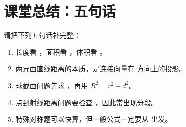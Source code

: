 \documentclass[11pt,a4paper]{ctexart}
\begin{document}


\section{课堂总结：五句话}

请把下列五句话补完整：

\begin{enumerate}[label=\arabic*. , leftmargin=2em, itemsep=1.2em]
  \item 长度看 \blank{3cm}，面积看 \blank{3cm}，体积看 \blank{3cm}。
  \item 两异面直线距离的本质，是连接向量在 \blank{4cm} 方向上的投影。
  \item 球截面问题先求 \blank{4cm}，再用 \(R^2=r^2+d^2\)。
  \item 点到射线距离问题要检查 \blank{5cm}，因此常出现分段。
  \item 特殊对称题可以快算，但一般公式一定要从 \blank{5cm} 出发。
\end{enumerate}
\end{document}
